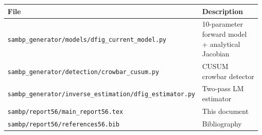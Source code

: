 \documentclass[11pt,a4paper]{article}
\begin{document}
\begin{tabular}{ll}
  \toprule
  File & Description \\
  \midrule
  \texttt{sambp\_generator/models/dfig\_current\_model.py}
    & 10-parameter forward model + analytical Jacobian \\
  \texttt{sambp\_generator/detection/crowbar\_cusum.py}
    & CUSUM crowbar detector \\
  \texttt{sambp\_generator/inverse\_estimation/dfig\_estimator.py}
    & Two-pass LM estimator \\
  \texttt{sambp/report56/main\_report56.tex}
    & This document \\
  \texttt{sambp/report56/references56.bib}
    & Bibliography \\
  \bottomrule
\end{tabular}



\end{document}
